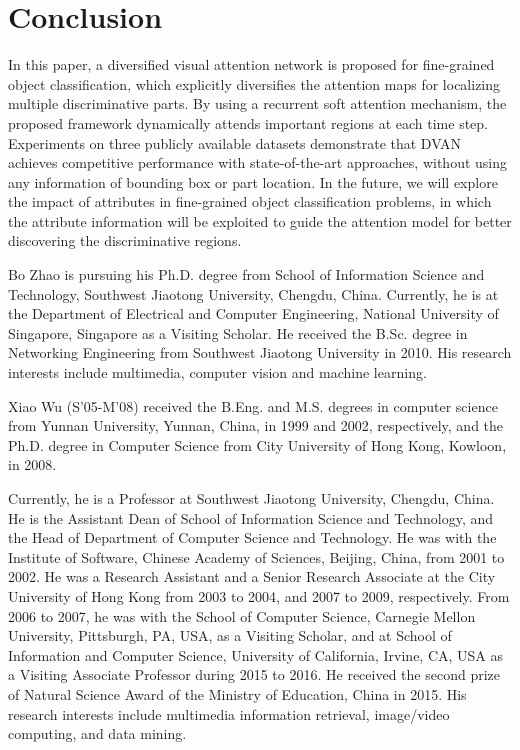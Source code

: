 \documentclass[journal]{IEEEtran}
\begin{document}
\section{Conclusion}
\label{sec:conclusion}

In this paper, a diversified visual attention network is proposed for fine-grained object classification, which explicitly diversifies the attention maps for localizing multiple discriminative parts. By using a recurrent soft attention mechanism, the proposed framework dynamically attends important regions at each time step. Experiments on three publicly available datasets demonstrate that DVAN achieves competitive performance with state-of-the-art approaches, without using any information of bounding box or part location. In the future, we will explore the impact of attributes in fine-grained object classification problems, in which the attribute information will be exploited to guide the attention model for better discovering the discriminative regions.





\begin{IEEEbiography}{Bo Zhao} is pursuing his Ph.D. degree from School of Information Science and Technology, Southwest Jiaotong University, Chengdu, China. Currently, he is at the Department of Electrical and Computer Engineering, National University of Singapore, Singapore as a Visiting Scholar. He received the B.Sc. degree in Networking Engineering from Southwest Jiaotong University in 2010. His research interests include multimedia, computer vision and machine learning.
\end{IEEEbiography}

\begin{IEEEbiography}{Xiao Wu}
	(S'05-M'08) received the B.Eng. and M.S. degrees in computer science from Yunnan University, Yunnan, China, in 1999 and 2002, respectively, and the Ph.D. degree in Computer Science from City University of Hong Kong, Kowloon, in 2008.

  Currently, he is a Professor at Southwest Jiaotong University, Chengdu, China. He is the Assistant Dean of School of Information Science and Technology, and the Head of Department of Computer Science and Technology. He was with the Institute of Software, Chinese Academy of Sciences, Beijing, China, from 2001 to 2002. He was a Research Assistant and a Senior Research Associate at the City University of Hong Kong from 2003 to 2004, and 2007 to 2009, respectively. From 2006 to 2007, he was with the School of Computer Science, Carnegie Mellon University, Pittsburgh, PA, USA, as a Visiting Scholar, and at School of Information and Computer Science, University of California, Irvine, CA, USA as a Visiting Associate Professor during 2015 to 2016. He received the second prize of Natural Science Award of the Ministry of Education, China in 2015. His research interests include multimedia information retrieval, image/video computing, and data mining.
\end{IEEEbiography}
\end{document}

